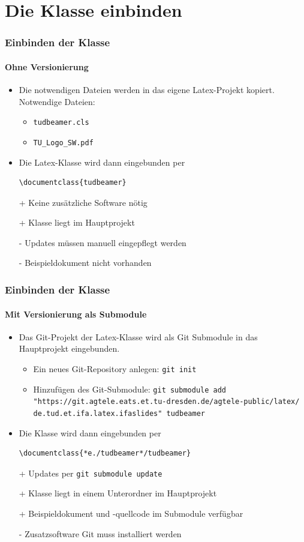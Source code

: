 \documentclass[german,notoc,draft]{tudbeamer}%
\begin{document}
\section{Die Klasse einbinden}
\begin{frame}[fragile]
	\frametitle{Einbinden der Klasse}
	\framesubtitle{Ohne Versionierung}

	\begin{itemize}
		\item Die notwendigen Dateien werden in das eigene Latex-Projekt kopiert. Notwendige Dateien:
		\begin{itemize}
		 	\item \texttt{tudbeamer.cls}
		 	\item \texttt{TU\_Logo\_SW.pdf}
		\end{itemize}
		\item Die Latex-Klasse wird dann eingebunden per
			\begin{lstlisting}[gobble=8,style=latex,numbers=none]
				\documentclass{tudbeamer}
			\end{lstlisting}
	\end{itemize}
	\begin{itemize}
		\item[+] Keine zusätzliche Software nötig
		\item[+] Klasse liegt im Hauptprojekt
		\item[-] Updates müssen manuell eingepflegt werden
		\item[-] Beispieldokument nicht vorhanden
	\end{itemize}
\end{frame}
\begin{frame}[fragile]
	\frametitle{Einbinden der Klasse}
	\framesubtitle{Mit Versionierung als Submodule}
	\begin{itemize}
		\item Das Git-Projekt der Latex-Klasse wird als Git Submodule in das Hauptprojekt eingebunden.
		\begin{itemize}
			\item Ein neues Git-Repository anlegen: \texttt{git init}
			\item Hinzufügen des Git-Submodule: \texttt{git submodule add "https://git.agtele.eats.et.tu-dresden.de/agtele-public/latex/ de.tud.et.ifa.latex.ifaslides" tudbeamer}
		\end{itemize}
		\item Die Klasse wird dann eingebunden per
			\begin{lstlisting}[gobble=8,style=latex,numbers=none]
				\documentclass{*e./tudbeamer*/tudbeamer}
			\end{lstlisting}
	\end{itemize}	
	\begin{itemize}
		\item[+] Updates per \texttt{git submodule update}
		\item[+] Klasse liegt in einem Unterordner im Hauptprojekt
		\item[+] Beispieldokument und -quellcode im Submodule verfügbar
		\item[-] Zusatzsoftware Git muss installiert werden
	\end{itemize}
\end{frame}
\end{document}
